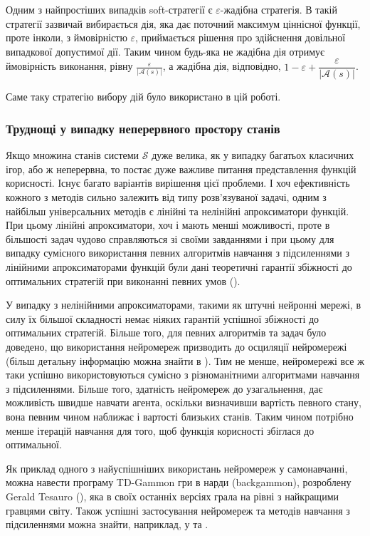 \documentclass[a4paper,10pt,fleqn]{article}
\begin{document}
Одним з найпростіших випадків soft-стратегії є $\varepsilon$-жадібна стратегія. В такій стратегії зазвичай вибирається дія, яка дає поточний максимум ціннісної функції, проте інколи, з ймовірністю $\varepsilon$, приймається рішення про здійснення довільної випадкової допустимої дії. Таким чином будь-яка не жадібна дія отримує ймовірність виконання, рівну $\frac{\varepsilon}{|\mathcal{A}(s)|}$, а жадібна дія, відповідно, $ 1 - \varepsilon + \dfrac{\varepsilon}{|\mathcal{A}(s)|}$.

Саме таку стратегію вибору дій було використано в цій роботі.

\subsubsection{Труднощі у випадку неперервного простору станів}

Якщо множина станів системи $\mathcal{S}$ дуже велика, як у випадку багатьох класичних ігор, або ж неперервна, то постає дуже важливе питання представлення функцій корисності. Існує багато варіантів вирішення цієї проблеми. І хоч ефективність кожного з методів сильно залежить від типу розв'язуваної задачі, одним з найбільш універсальних методів є лінійні та нелінійні апроксиматори функцій. При цьому лінійні апроксиматори, хоч і мають менші можливості, проте в більшості задач чудово справляються зі своїми завданнями і при цьому для випадку сумісного використання певних алгоритмів навчання з підсиленнями з лінійними апроксиматорами функцій були дані теоретичні гарантії збіжності до оптимальних стратегій при виконанні певних умов (\cite{Coulom2002}).

У випадку з нелінійними апроксиматорами, такими як штучні нейронні мережі, в силу їх більшої складності немає ніяких гарантій успішної збіжності до оптимальних стратегій. Більше того, для певних алгоритмів та задач було доведено, що використання нейромереж призводить до осциляції нейромережі (більш детальну інформацію можна знайти в \cite{SuttonBarto2002}). Тим не менше, нейромережі все ж таки успішно використовуються сумісно з різноманітними алгоритмами навчання з підсиленнями. Більше того, здатність нейромереж до узагальнення, дає можливість швидше навчати агента, оскільки визначивши вартість певного стану, вона певним чином наближає і вартості близьких станів. Таким чином потрібно менше ітерацій навчання для того, щоб функція корисності збіглася до оптимальної.

Як приклад одного з найуспішніших використань нейромереж у самонавчанні, можна навести програму TD-Gammon гри в нарди (backgammon), розроблену Gerald Tesauro (\cite{Tesauro1995}), яка в своїх останніх версіях грала на рівні з найкращими гравцями світу. Також успішні застосування нейромереж та методів навчання з підсиленнями можна знайти, наприклад, у \cite{Rummery1995} та \cite{Coulom2002}.
\end{document}
